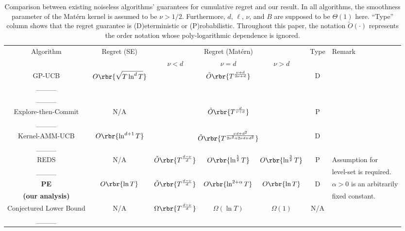\begin{table*}[tb]
    \centering
    \caption{Comparison between existing noiseless algorithms' guarantees for cumulative regret and our result. 
    In all algorithms, the smoothness parameter of the Mat\'ern kernel is assumed to be $\nu > 1/2$.
    Furthermore, $d$, $\ell$, $\nu$, and $B$ are supposed to be $\Theta(1)$ here. ``Type'' column shows that the regret guarantee is  (D)eterministic or (P)robabilistic. Throughout this paper, the notation $\tilde{O}(\cdot)$ represents the order notation whose poly-logarithmic dependence is ignored.
    }
    \begin{tabular}{c|c|c|c|c|c|l}
    \multicolumn{1}{c|}{\multirow{2}{*}{Algorithm}} & \multicolumn{1}{|c|}{\multirow{2}{*}{Regret (SE)}} & \multicolumn{3}{|c|}{Regret (Mat\'ern)} & \multirow{2}{*}{Type} & \multirow{2}{*}{Remark} \\ \cline{3-5}
    \multicolumn{1}{c|}{}  & \multicolumn{1}{|c|}{}  & $\nu < d$  & $\nu = d$  & $\nu > d$ &  & \\ \hline \hline
     GP-UCB & \multirow{3}{*}{$O\rbr{\sqrt{T \ln^{d} T}}$} & \multicolumn{3}{|c|}{\multirow{3}{*}{$\tilde{O}\rbr{T^{\frac{\nu + d}{2\nu + d}}}$}} & \multirow{3}{*}{D} & \\ 
     ____ & & \multicolumn{3}{|c|}{} & & \\ 
     ____ & & \multicolumn{3}{|c|}{} & & \\ \hline
     Explore-then-Commit & \multirow{2}{*}{N/A} & \multicolumn{3}{|c|}{\multirow{2}{*}{$\tilde{O}\rbr{T^{\frac{d}{\nu + d}}}$}} & \multirow{2}{*}{P} & \\ 
     ____ &  & \multicolumn{3}{|c|}{} & & \\ \hline
         Kernel-AMM-UCB
      & \multirow{2}{*}{$O\rbr{\ln^{d+1} T}$} & \multicolumn{3}{|c|}{\multirow{2}{*}{$\tilde{O}\rbr{T^{\frac{\nu d + d^2}{2\nu^2 + 2\nu d + d^2}}}$}} & \multirow{2}{*}{D} & \\ 
      ____
      &  & \multicolumn{3}{|c|}{} & & \\ \hline
     REDS & \multirow{2}{*}{N/A} & \multirow{2}{*}{$\tilde{O}\rbr{T^{\frac{d - \nu}{d}}}$} & \multirow{2}{*}{$O\rbr{\ln^{\frac{5}{2}} T}$} & \multirow{2}{*}{$O\rbr{\ln^{\frac{3}{2}} T}$} & \multirow{2}{*}{P} & Assumption for \\
     ____ &  &  &  &  & & level-set is required. \\ \hline
     \textbf{PE} & \multirow{2}{*}{$O\rbr{\ln T}$} & \multirow{2}{*}{$\tilde{O}\rbr{T^{\frac{d - \nu}{d}}}$} & \multirow{2}{*}{$O\rbr{\ln^{2 +\alpha} T}$} & \multirow{2}{*}{$O\rbr{\ln T}$} & \multirow{2}{*}{D} & $\alpha > 0$ is an arbitrarily  \\ 
     \textbf{(our analysis)} & & & & &  & fixed constant. \\ \hline
     Conjectured Lower Bound & \multirow{2}{*}{N/A} & \multirow{2}{*}{$\Omega\rbr{T^{\frac{d - \nu}{d}}}$} & \multirow{2}{*}{$\Omega(\ln T)$} & \multirow{2}{*}{$\Omega(1)$} & \multirow{2}{*}{N/A} & \\
     ____ & & & & & & \\
    \end{tabular}
    \label{tab:nl_cr_compare}
\end{table*}